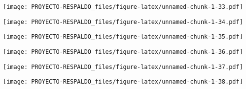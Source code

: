 \documentclass[
]{article}
\newenvironment{Shaded}{\begin{snugshade}}{\end{snugshade}}
\newcommand{\DataTypeTok}[1]{\textcolor[rgb]{0.13,0.29,0.53}{#1}}
\newcommand{\KeywordTok}[1]{\textcolor[rgb]{0.13,0.29,0.53}{\textbf{#1}}}
\newcommand{\NormalTok}[1]{#1}
\newcommand{\OperatorTok}[1]{\textcolor[rgb]{0.81,0.36,0.00}{\textbf{#1}}}
\newcommand{\StringTok}[1]{\textcolor[rgb]{0.31,0.60,0.02}{#1}}
\begin{document}
\texttt{[image: PROYECTO-RESPALDO\_files/figure-latex/unnamed-chunk-1-33.pdf]}

\begin{Shaded}
\end{Shaded}

\texttt{[image: PROYECTO-RESPALDO\_files/figure-latex/unnamed-chunk-1-34.pdf]}

\begin{Shaded}
\end{Shaded}

\texttt{[image: PROYECTO-RESPALDO\_files/figure-latex/unnamed-chunk-1-35.pdf]}

\begin{Shaded}
\end{Shaded}

\texttt{[image: PROYECTO-RESPALDO\_files/figure-latex/unnamed-chunk-1-36.pdf]}

\begin{Shaded}
\end{Shaded}

\texttt{[image: PROYECTO-RESPALDO\_files/figure-latex/unnamed-chunk-1-37.pdf]}

\begin{Shaded}
\end{Shaded}

\texttt{[image: PROYECTO-RESPALDO\_files/figure-latex/unnamed-chunk-1-38.pdf]}

\begin{Shaded}
\end{Shaded}
\end{document}
